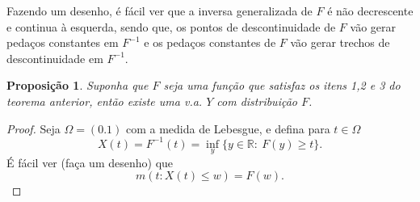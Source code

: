 \documentclass[12pt,a4paper,oneside]{book}
\newtheorem{theorem}{Teorema}[section]
\newtheorem{proposition}[theorem]{Proposi\c{c}\~ao}
\theoremstyle{definition}
\newtheorem{definition}[theorem]{Defini\c{c}\~ao}
\theoremstyle{remark}
\numberwithin{equation}{section}
\newcommand{\R}{\mathbb{R}}
\begin{document}
\begin{tcolorbox}[colback = yellow!60]
Fazendo um desenho, é fácil ver que a inversa generalizada de $F$ é não decrescente e continua à esquerda, sendo que, os pontos de descontinuidade de $F$ vão gerar pedaços constantes em $F^{-1}$ e os pedaços constantes de $F$ vão gerar trechos de descontinuidade em $F^{-1}$.
\end{tcolorbox}


\begin{proposition}\label{prop- volta da funcDistri}
Suponha que $F$ seja uma função que satisfaz os itens 1,2 e 3 do teorema anterior, então existe uma v.a. $Y$ com distribuição $F$.
\end{proposition}
\begin{proof}
Seja $\Omega = (0.1)$ com a medida de Lebesgue, e defina para $t\in \Omega$
$$X(t) = F^{-1}(t) =  \inf_y \{ y\in \R:\ F(y) \geq  t  \}.$$
É fácil ver (faça um desenho) que 
$$m(t:X(t)\leq w) = F(w).  $$
\end{proof}

\newpage
\end{document}
